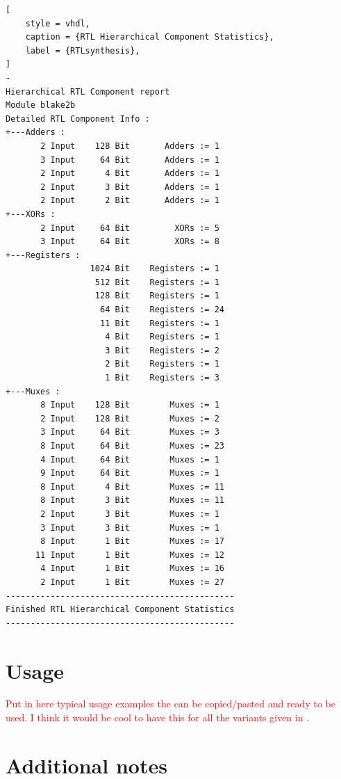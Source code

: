 \documentclass[%
	a4paper,
]
{article}
\newcommand{\todo}[1]{\textcolor{red}{#1}}
\begin{document}
\begin{lstlisting}[
	style = vhdl,
	caption = {RTL Hierarchical Component Statistics},
	label = {RTLsynthesis},
]
-
Hierarchical RTL Component report 
Module blake2b 
Detailed RTL Component Info : 
+---Adders : 
	   2 Input    128 Bit       Adders := 1     
	   3 Input     64 Bit       Adders := 1     
	   2 Input      4 Bit       Adders := 1     
	   2 Input      3 Bit       Adders := 1     
	   2 Input      2 Bit       Adders := 1     
+---XORs : 
	   2 Input     64 Bit         XORs := 5     
	   3 Input     64 Bit         XORs := 8     
+---Registers : 
	             1024 Bit    Registers := 1     
	              512 Bit    Registers := 1     
	              128 Bit    Registers := 1     
	               64 Bit    Registers := 24    
	               11 Bit    Registers := 1    
	                4 Bit    Registers := 1     
	                3 Bit    Registers := 2     
	                2 Bit    Registers := 1     
	                1 Bit    Registers := 3     
+---Muxes : 
	   8 Input    128 Bit        Muxes := 1     
	   2 Input    128 Bit        Muxes := 2     
	   3 Input     64 Bit        Muxes := 3     
	   8 Input     64 Bit        Muxes := 23    
	   4 Input     64 Bit        Muxes := 1     
	   9 Input     64 Bit        Muxes := 1     
	   8 Input      4 Bit        Muxes := 11    
	   8 Input      3 Bit        Muxes := 11    
	   2 Input      3 Bit        Muxes := 1     
	   3 Input      3 Bit        Muxes := 1     
	   8 Input      1 Bit        Muxes := 17    
	  11 Input      1 Bit        Muxes := 12    
	   4 Input      1 Bit        Muxes := 16    
	   2 Input      1 Bit        Muxes := 27    
----------------------------------------------
Finished RTL Hierarchical Component Statistics
----------------------------------------------

\end{lstlisting}
%
%
\section{Usage}
\label{sec:usage}

\todo{Put in here typical usage examples the can be copied/pasted and ready to be
used. I think it would be cool to have this for all the variants given in
\Cref{sec:resource-allocation}}.
%
%
\section{Additional notes}
\label{sec:additional-notes}
\end{document}
